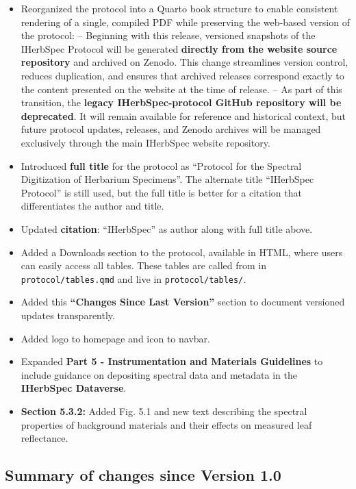 \documentclass[
  letterpaper,
  DIV=11,
  numbers=noendperiod]{scrreprt}
\begin{document}
\begin{itemize}
\item
  Reorganized the protocol into a Quarto book structure to enable
  consistent rendering of a single, compiled PDF while preserving the
  web-based version of the protocol: -- Beginning with this release,
  versioned snapshots of the IHerbSpec Protocol will be generated
  \textbf{directly from the website source repository} and archived on
  Zenodo. This change streamlines version control, reduces duplication,
  and ensures that archived releases correspond exactly to the content
  presented on the website at the time of release. -- As part of this
  transition, the \textbf{legacy IHerbSpec-protocol GitHub repository
  will be deprecated}. It will remain available for reference and
  historical context, but future protocol updates, releases, and Zenodo
  archives will be managed exclusively through the main IHerbSpec
  website repository.
\item
  Introduced \textbf{full title} for the protocol as ``Protocol for the
  Spectral Digitization of Herbarium Specimens''. The alternate title
  ``IHerbSpec Protocol'' is still used, but the full title is better for
  a citation that differentiates the author and title.
\item
  Updated \textbf{citation}: ``IHerbSpec'' as author along with full
  title above.
\item
  Added a Downloads section to the protocol, available in HTML, where
  users can easily access all tables. These tables are called from in
  \texttt{protocol/tables.qmd} and live in \texttt{protocol/tables/}.
\item
  Added this \textbf{``Changes Since Last Version''} section to document
  versioned updates transparently.
\item
  Added logo to homepage and icon to navbar.
\item
  Expanded \textbf{Part 5 - Instrumentation and Materials Guidelines} to
  include guidance on depositing spectral data and metadata in the
  \textbf{IHerbSpec Dataverse}.
\item
  \textbf{Section 5.3.2:} Added Fig. 5.1 and new text describing the
  spectral properties of background materials and their effects on
  measured leaf reflectance.
\end{itemize}

\subsection{Summary of changes since Version
1.0}\label{summary-of-changes-since-version-1.0}
\end{document}
